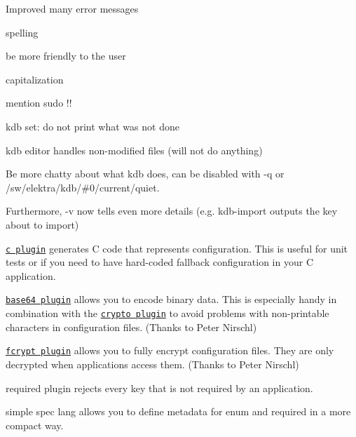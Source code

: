 \begin{DoxyItemize}
\item Improved many error messages
\begin{DoxyItemize}
\item spelling
\item be more friendly to the user
\item capitalization
\item mention {\ttfamily sudo !!}
\end{DoxyItemize}
\item {\ttfamily kdb set}\+: do not print what was not done
\item {\ttfamily kdb editor} handles non-\/modified files (will not do anything)
\item Be more chatty about what {\ttfamily kdb} does, can be disabled with {\ttfamily -\/q} or {\ttfamily /sw/elektra/kdb/\#0/current/quiet}.
\item Furthermore, {\ttfamily -\/v} now tells even more details (e.\+g. {\ttfamily kdb-\/import} outputs the key about to import)
\end{DoxyItemize}


\begin{DoxyItemize}
\item \href{https://master.libelektra.org/src/plugins/c}{\tt c plugin} generates C code that represents configuration. This is useful for unit tests or if you need to have hard-\/coded fallback configuration in your C application.
\item \href{https://master.libelektra.org/src/plugins/base64}{\tt base64 plugin} allows you to encode binary data. This is especially handy in combination with the \href{https://master.libelektra.org/src/plugins/crypto}{\tt crypto plugin} to avoid problems with non-\/printable characters in configuration files. (Thanks to Peter Nirschl)
\item \href{https://master.libelektra.org/src/plugins/fcrypt}{\tt fcrypt plugin} allows you to fully encrypt configuration files. They are only decrypted when applications access them. (Thanks to Peter Nirschl)
\item required plugin rejects every key that is not required by an application.
\item simple spec lang allows you to define metadata for enum and required in a more compact way.
\end{DoxyItemize}


